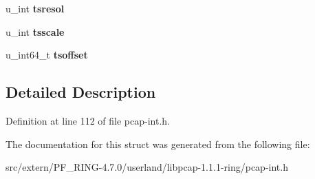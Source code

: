\begin{DoxyCompactItemize}
\item 
\hypertarget{structpcap__sf_a35b87c17ae8c6ab27e33c1dad018533b}{
u\_\-int {\bfseries tsresol}}
\label{structpcap__sf_a35b87c17ae8c6ab27e33c1dad018533b}

\item 
\hypertarget{structpcap__sf_a049b8a136c12906188de9874206bc3aa}{
u\_\-int {\bfseries tsscale}}
\label{structpcap__sf_a049b8a136c12906188de9874206bc3aa}

\item 
\hypertarget{structpcap__sf_ae77eef2f2aea9ed50bb05b8c7a2940e8}{
u\_\-int64\_\-t {\bfseries tsoffset}}
\label{structpcap__sf_ae77eef2f2aea9ed50bb05b8c7a2940e8}

\end{DoxyCompactItemize}


\subsection{Detailed Description}


Definition at line 112 of file pcap-\/int.h.



The documentation for this struct was generated from the following file:\begin{DoxyCompactItemize}
\item 
src/extern/PF\_\-RING-\/4.7.0/userland/libpcap-\/1.1.1-\/ring/pcap-\/int.h\end{DoxyCompactItemize}
